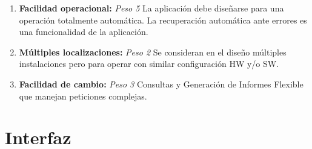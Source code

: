 \documentclass[11pt,a4paper,spanish,twoside]{book}
\begin{document}
\begin{enumerate}[{\bf 1.}]
\item {\bf Facilidad operacional:} \emph{Peso 5} La aplicación debe diseñarse
  para una operación totalmente automática. La recuperación automática ante
  errores es una funcionalidad de la aplicación. 

\item {\bf Múltiples localizaciones:} \emph{Peso 2} Se consideran en el diseño múltiples
  instalaciones pero para operar con similar configuración HW y/o SW.

\item {\bf Facilidad de cambio:} \emph{Peso 3} Consultas y Generación de
  Informes Flexible que manejan peticiones complejas.

\end{enumerate}

\section{Interfaz}
\end{document}
